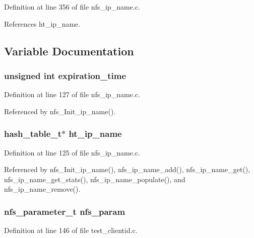 Definition at line 356 of file nfs\_\-ip\_\-name.c.

References ht\_\-ip\_\-name.

\subsection{Variable Documentation}
\subsubsection{\setlength{\rightskip}{0pt plus 5cm}unsigned int {\bf expiration\_\-time}}\label{nfs__ip__name_8c_a2}




Definition at line 127 of file nfs\_\-ip\_\-name.c.

Referenced by nfs\_\-Init\_\-ip\_\-name().
\subsubsection{\setlength{\rightskip}{0pt plus 5cm}hash\_\-table\_\-t$\ast$ {\bf ht\_\-ip\_\-name}}\label{nfs__ip__name_8c_a0}




Definition at line 125 of file nfs\_\-ip\_\-name.c.

Referenced by nfs\_\-Init\_\-ip\_\-name(), nfs\_\-ip\_\-name\_\-add(), nfs\_\-ip\_\-name\_\-get(), nfs\_\-ip\_\-name\_\-get\_\-stats(), nfs\_\-ip\_\-name\_\-populate(), and nfs\_\-ip\_\-name\_\-remove().
\subsubsection{\setlength{\rightskip}{0pt plus 5cm}nfs\_\-parameter\_\-t {\bf nfs\_\-param}}\label{nfs__ip__name_8c_a1}




Definition at line 146 of file test\_\-clientid.c.